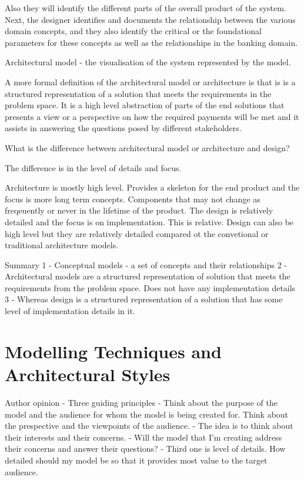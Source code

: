 \documentclass[a4paper, 11pt]{book}
\begin{document}
    Also they will identify the different parts of the overall product of the system.
    Next, the designer identifies and documents the relationship between the various domain concepts, and they also identify the critical or the foundational parameters for these concepts as well as the relationships in the banking domain.

    Architectural model - the visualisation of the system represented by the model.

    A more formal definition of the architectural model or architecture is that is is a structured representation of a solution that meets the requirements in the problem space.
    It is a high level abstraction of parts of the end solutions that presents a view or a perspective on how the required payments will be met and it assists in answering the questions posed by different stakeholders.

    What is the difference between architectural model or architecture and design?

    The difference is in the level of details and focus.

    Architecture is mostly high level.
    Provides a skeleton for the end product and the focus is more long term concepts. Components that may not change as freqeuently or never in the lifetime of the product.
    The design is relatively detailed and the focus is on implementation.
    This is relative. Design can also be high level but they are relatively detailed compared ot the convetional or traditional architecture models.

    Summary
    1 - Conceptual models - a set of concepts and their relationships
    2 - Architectural models are a structured representation of solution that meets the requirements from the problem space. Does not have any implementation details
    3 - Whereas design is a structured representation of a solution that has some level of implementation details in it.


    \section{Modelling Techniques and Architectural Styles}
    Author opinion
    - Three guiding principles
    - Think about the purpose of the model and the audience for whom the model is being created for. Think about the prespective and the viewpoints of the audience.
    - The idea is to think about their interests and their concerns.
    - Will the model that I'm creating address their concerns and answer their questions?
    - Third one is level of details. How detailed should my model be so that it provides most value to the target audience.
\end{document}
